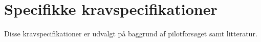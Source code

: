 \section{Specifikke kravspecifikationer}
Disse kravspecifikationer er udvalgt på baggrund af pilotforsøget samt litteratur.